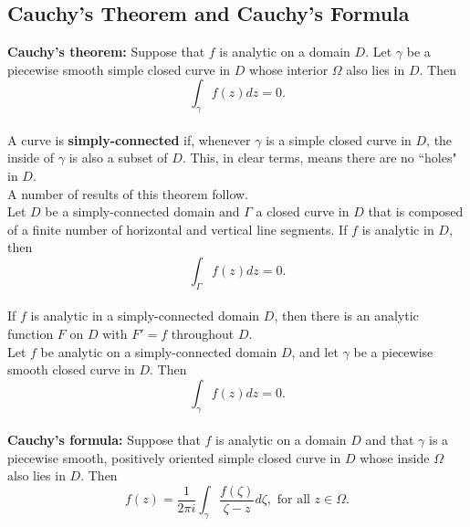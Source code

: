 \documentclass[12pt,letterpaper]{article}
\begin{document}
\subsection{Cauchy's Theorem and Cauchy's Formula}

\textbf{Cauchy's theorem:} Suppose that \(f\) is analytic on a domain \(D\). Let \(\gamma\) be a piecewise smooth simple closed curve in \(D\) whose interior \(\Omega\) also lies in \(D\). Then \[\int_{\gamma} f(z)dz = 0.\] \\
	
A curve is \textbf{simply-connected} if, whenever \(\gamma\) is a simple closed curve in \(D\), the inside of \(\gamma\) is also a subset of \(D\). This, in clear terms, means there are no ``holes" in \(D\). \\

A number of results of this theorem follow. \\

Let \(D\) be a simply-connected domain and \(\Gamma\) a closed curve in \(D\) that is composed of a finite number of horizontal and vertical line segments. If \(f\) is analytic in \(D\), then \[\int_{\Gamma} f(z)dz = 0.\] \\

If \(f\) is analytic in a simply-connected domain \(D\), then there is an analytic function \(F\) on \(D\) with \(F' = f\) throughout \(D\). \\

Let \(f\) be analytic on a simply-connected domain \(D\), and let \(\gamma\) be a piecewise smooth closed curve in \(D\). Then \[\int_{\gamma} f(z)dz = 0.\] \\

\textbf{Cauchy's formula:} Suppose that \(f\) is analytic on a domain \(D\) and that \(\gamma\) is a piecewise smooth, positively oriented simple closed curve in \(D\) whose inside \(\Omega\) also lies in \(D\). Then \[f(z) = \frac{1}{2\pi i}\int_{\gamma} \frac{f(\zeta)}{\zeta - z}d\zeta, \text{ for all } z \in \Omega.\]
\end{document}
